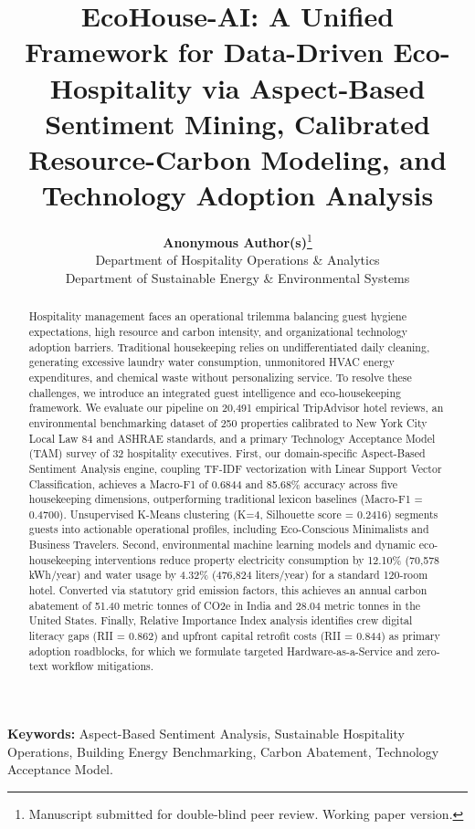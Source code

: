 \documentclass[11pt,a4paper]{article}
\title{\textbf{EcoHouse-AI: A Unified Framework for Data-Driven Eco-Hospitality via Aspect-Based Sentiment Mining, Calibrated Resource-Carbon Modeling, and Technology Adoption Analysis}}
\author{
    \textbf{Anonymous Author(s)}\footnote{Manuscript submitted for double-blind peer review. Working paper version.}\\
    Department of Hospitality Operations \& Analytics\\
    Department of Sustainable Energy \& Environmental Systems
}
\date{}
\begin{document}
\maketitle

\begin{abstract}
Hospitality management faces an operational trilemma balancing guest hygiene expectations, high resource and carbon intensity, and organizational technology adoption barriers. Traditional housekeeping relies on undifferentiated daily cleaning, generating excessive laundry water consumption, unmonitored HVAC energy expenditures, and chemical waste without personalizing service. To resolve these challenges, we introduce an integrated guest intelligence and eco-housekeeping framework. We evaluate our pipeline on 20,491 empirical TripAdvisor hotel reviews, an environmental benchmarking dataset of 250 properties calibrated to New York City Local Law 84 and ASHRAE standards, and a primary Technology Acceptance Model (TAM) survey of 32 hospitality executives. First, our domain-specific Aspect-Based Sentiment Analysis engine, coupling TF-IDF vectorization with Linear Support Vector Classification, achieves a Macro-F1 of 0.6844 and 85.68\% accuracy across five housekeeping dimensions, outperforming traditional lexicon baselines (Macro-F1 = 0.4700). Unsupervised K-Means clustering (K=4, Silhouette score = 0.2416) segments guests into actionable operational profiles, including Eco-Conscious Minimalists and Business Travelers. Second, environmental machine learning models and dynamic eco-housekeeping interventions reduce property electricity consumption by 12.10\% (70,578 kWh/year) and water usage by 4.32\% (476,824 liters/year) for a standard 120-room hotel. Converted via statutory grid emission factors, this achieves an annual carbon abatement of 51.40 metric tonnes of CO2e in India and 28.04 metric tonnes in the United States. Finally, Relative Importance Index analysis identifies crew digital literacy gaps (RII = 0.862) and upfront capital retrofit costs (RII = 0.844) as primary adoption roadblocks, for which we formulate targeted Hardware-as-a-Service and zero-text workflow mitigations.
\end{abstract}

\vspace{0.5em}
\noindent\textbf{Keywords:} Aspect-Based Sentiment Analysis, Sustainable Hospitality Operations, Building Energy Benchmarking, Carbon Abatement, Technology Acceptance Model.

\vspace{1.5em}
\end{document}
